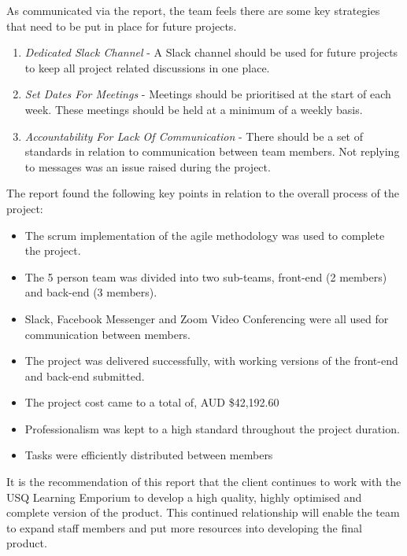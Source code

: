 \documentclass[11pt]{article}
\begin{document}
As communicated via the report, the team feels there are some key strategies that need to be put in place for future projects.

\begin{enumerate}
\item \textit{Dedicated Slack Channel} - A Slack channel should be used for future projects to keep all project related discussions in one place.
\item \textit{Set Dates For Meetings} - Meetings should be prioritised at the start of each week. These meetings should be held at a minimum of a weekly basis.
\item \textit{Accountability For Lack Of Communication} - There should be a set of standards in relation to communication between team members. Not replying to messages was an issue raised during the project.
\end{enumerate} 

The report found the following key points in relation to the overall process of the project: 

\begin{itemize}
\item The scrum implementation of the agile methodology was used to complete the project.
\item The 5 person team was divided into two sub-teams, front-end (2 members) and back-end (3 members).
\item Slack, Facebook Messenger and Zoom Video Conferencing were all used for communication between members.
\item The project was delivered successfully, with working versions of the front-end and back-end submitted.
\item The project cost came to a total of, AUD \$42,192.60
\item Professionalism was kept to a high standard throughout the project duration.
\item Tasks were efficiently distributed between members
\end{itemize}

It is the recommendation of this report that the client continues to work with the USQ Learning Emporium to develop a high quality, highly optimised and complete version of the product. This continued relationship will enable the team to expand staff members and put more resources into developing the final product.


\newpage

\end{document}
